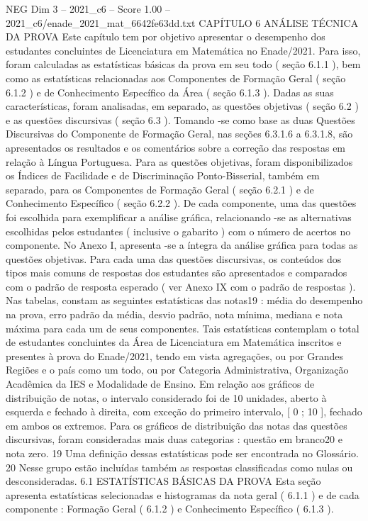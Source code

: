 \begin{textsample}{NEG Dim 3 – 2021\_c6 – Score 1.00 – 2021\_c6/enade\_2021\_mat\_6642fe63dd.txt}  \label{ex:f3_neg_235}
CAPÍTULO 6 ANÁLISE TÉCNICA DA PROVA Este capítulo tem por objetivo apresentar o desempenho dos estudantes concluintes de Licenciatura em Matemática no Enade/2021.
Para isso, foram calculadas as estatísticas básicas da prova em seu todo ( seção 6.1.1 ), bem como as estatísticas relacionadas aos Componentes de Formação Geral ( seção 6.1.2 ) e de Conhecimento Específico da Área ( seção 6.1.3 ).
Dadas as suas características, foram analisadas, em separado, as questões objetivas ( seção 6.2 ) e as questões discursivas ( seção 6.3 ).
Tomando -se como base as duas Questões Discursivas do Componente de Formação Geral, nas seções 6.3.1.6 a 6.3.1.8, são apresentados os resultados e os comentários sobre a correção das respostas em relação à Língua Portuguesa.
Para as questões objetivas, foram disponibilizados os Índices de Facilidade e de Discriminação Ponto-Bisserial, também em separado, para os Componentes de Formação Geral ( seção 6.2.1 ) e de Conhecimento Específico ( seção 6.2.2 ).
De cada componente, uma das questões foi escolhida para exemplificar a análise gráfica, relacionando -se as alternativas escolhidas pelos estudantes ( inclusive o gabarito ) com o número de acertos no componente.
No Anexo I, apresenta -se a íntegra da análise gráfica para todas as questões objetivas.
Para cada uma das questões discursivas, os conteúdos dos tipos mais comuns de respostas dos estudantes são apresentados e comparados com o padrão de resposta esperado ( ver Anexo IX com o padrão de respostas ).
Nas tabelas, constam as seguintes estatísticas das notas19 : média do desempenho na prova, erro padrão da média, desvio padrão, nota mínima, mediana e nota máxima para cada um de seus componentes.
Tais estatísticas contemplam o total de estudantes concluintes da Área de Licenciatura em Matemática inscritos e presentes à prova do Enade/2021, tendo em vista agregações, ou por Grandes Regiões e o país como um todo, ou por Categoria Administrativa, Organização Acadêmica da IES e Modalidade de Ensino.
Em relação aos gráficos de distribuição de notas, o intervalo considerado foi de 10 unidades, aberto à esquerda e fechado à direita, com exceção do primeiro intervalo, [ 0 ; 10 ], fechado em ambos os extremos.
Para os gráficos de distribuição das notas das questões discursivas, foram consideradas mais duas categorias : questão em branco20 e nota zero. 19 Uma definição dessas estatísticas pode ser encontrada no Glossário. 20 Nesse grupo estão incluídas também as respostas classificadas como nulas ou desconsideradas. 6.1 ESTATÍSTICAS BÁSICAS DA PROVA Esta seção apresenta estatísticas selecionadas e histogramas da nota geral ( 6.1.1 ) e de cada componente : Formação Geral ( 6.1.2 ) e Conhecimento Específico ( 6.1.3 ).

\end{textsample}
